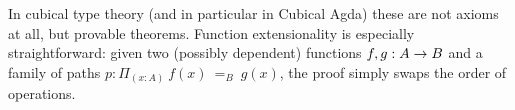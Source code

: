 In cubical type theory (and in particular in Cubical Agda) these are not axioms
at all, but provable theorems. Function extensionality is especially
straightforward: given two (possibly dependent) functions $f,g : A \rightarrow B$ and a
family of paths $p : \Pi_{(x:A)}~f(x)~=_B~g(x)$, the proof simply swaps the
order of operations.
\begin{code}%
\>[0]\AgdaSpace{}%
\AgdaSymbol{:}\AgdaSpace{}%
\AgdaSymbol{\{}\AgdaSpace{}%
\AgdaSpace{}%
\AgdaSymbol{:}\AgdaSpace{}%
\AgdaSymbol{\}}\AgdaSpace{}%
\AgdaSymbol{\{}\AgdaSpace{}%
\AgdaSpace{}%
\AgdaSymbol{:}\AgdaSpace{}%
\AgdaSpace{}%
\AgdaSpace{}%
\AgdaSymbol{\}}\AgdaSpace{}%
\AgdaSymbol{(}\AgdaSpace{}%
\AgdaSymbol{:}\AgdaSpace{}%
\AgdaSymbol{(}\AgdaSpace{}%
\AgdaSymbol{:}\AgdaSpace{}%
\AgdaSymbol{)}\AgdaSpace{}%
\AgdaSpace{}%
\AgdaSpace{}%
\AgdaSpace{}%
\AgdaSpace{}%
\AgdaSpace{}%
\AgdaSymbol{)}\AgdaSpace{}%
\AgdaSpace{}%
\AgdaSpace{}%
\AgdaSpace{}%
\<%
\\
\>[0]\AgdaSpace{}%
\AgdaSpace{}%
\AgdaSpace{}%
\AgdaSpace{}%
\AgdaSymbol{=}\AgdaSpace{}%
\AgdaSpace{}%
\AgdaSpace{}%
\<%
\end{code}

